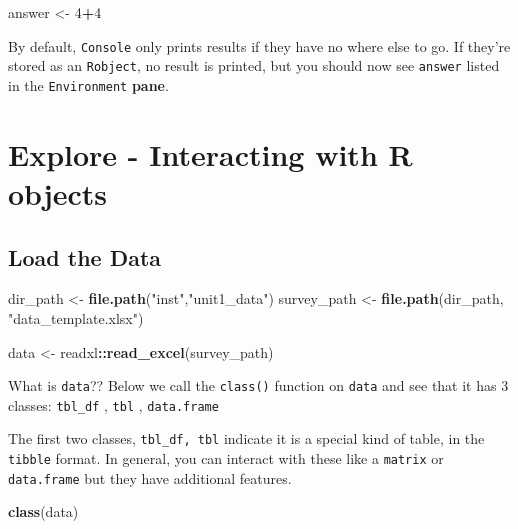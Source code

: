 \documentclass[
]{book}
\newenvironment{Shaded}{\begin{snugshade}}{\end{snugshade}}
\newcommand{\DecValTok}[1]{\textcolor[rgb]{0.00,0.00,0.81}{#1}}
\newcommand{\FunctionTok}[1]{\textcolor[rgb]{0.13,0.29,0.53}{\textbf{#1}}}
\newcommand{\NormalTok}[1]{#1}
\newcommand{\OtherTok}[1]{\textcolor[rgb]{0.56,0.35,0.01}{#1}}
\newcommand{\SpecialCharTok}[1]{\textcolor[rgb]{0.81,0.36,0.00}{\textbf{#1}}}
\newcommand{\StringTok}[1]{\textcolor[rgb]{0.31,0.60,0.02}{#1}}
\begin{document}
\begin{Shaded}
\begin{Highlighting}[]
\NormalTok{answer }\OtherTok{\textless{}{-}} \DecValTok{4}\SpecialCharTok{+}\DecValTok{4}
\end{Highlighting}
\end{Shaded}

By default, \texttt{Console} only prints results if they have no where else to go. If they're stored as an \texttt{Robject}, no result is printed, but you should now see \texttt{answer} listed in the \texttt{Environment} \textbf{pane}.

\hypertarget{explore---interacting-with-r-objects}{%
\section{Explore - Interacting with R objects}\label{explore---interacting-with-r-objects}}

\hypertarget{load-the-data}{%
\subsection{Load the Data}\label{load-the-data}}

\begin{Shaded}
\begin{Highlighting}[]
\NormalTok{dir\_path }\OtherTok{\textless{}{-}} \FunctionTok{file.path}\NormalTok{(}\StringTok{"inst"}\NormalTok{,}\StringTok{"unit1\_data"}\NormalTok{)}
\NormalTok{survey\_path }\OtherTok{\textless{}{-}} \FunctionTok{file.path}\NormalTok{(dir\_path, }\StringTok{"data\_template.xlsx"}\NormalTok{)}

\NormalTok{data }\OtherTok{\textless{}{-}}\NormalTok{ readxl}\SpecialCharTok{::}\FunctionTok{read\_excel}\NormalTok{(survey\_path)}
\end{Highlighting}
\end{Shaded}

What is \texttt{data}?? Below we call the \texttt{class()} function on \texttt{data} and see that it has 3 classes:
\texttt{tbl\_df} , \texttt{tbl} , \texttt{data.frame}

The first two classes, \texttt{tbl\_df,\ tbl} indicate it is a special kind of table, in the \texttt{tibble} format. In general, you can interact with these like a \texttt{matrix} or \texttt{data.frame} but they have additional features.

\begin{Shaded}
\begin{Highlighting}[]
\FunctionTok{class}\NormalTok{(data)}
\end{Highlighting}
\end{Shaded}
\end{document}
